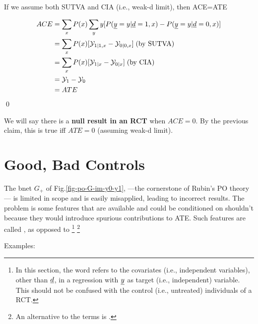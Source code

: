 \begin{claim}\label{cl-ace-ate}
If we assume both SUTVA and
CIA (i.e., weak-d limit), then
\beq
ACE=ATE
\eeq
\end{claim}
\proof



\begin{align}
ACE&=
\sum_x P(x)\sum_y y [P(\rvy=y|\rvd=1,x)-
P(\rvy=y|\rvd=0,x)]
\\
&=\sum_x P(x)[\caly_{1|1, x}-\caly_{0|0, x}]
\;\text{(by SUTVA)}
\\
&=\sum_x P(x)[\caly_{1|x}-\caly_{0|x}]
\;\text{(by CIA)}
\\
&=
\caly_{1}-\caly_{0}
\\
&=
ATE
\end{align}
\qed

We will say there is a {\bf null result
in an RCT} when $ACE=0$. By the previous claim,
this is true iff $ATE=0$
(assuming weak-d limit).

\section{Good, Bad Controls}

The bnet $G_+$
of Fig.\ref{fig-po-G-im-y0-y1},
---the cornerstone of Rubin's
PO theory--- is limited in scope
and is easily
misapplied, leading
to incorrect results.
The problem is
some features
that are available
and could be conditioned on
shouldn't because they
would introduce spurious
contributions to ATE.
Such features are called
,
as opposed to \footnote{
In this section,
the word 
refers to the covariates
(i.e., independent
variables),
other than $\rvd$,
in a regression
with $\rvy$  as target
(i.e., independent)
variable.
This should
not be confused
with the
control
(i.e., untreated)
individuals
of a RCT.}
\footnote{An alternative to
the terms  is
.}

Examples:


